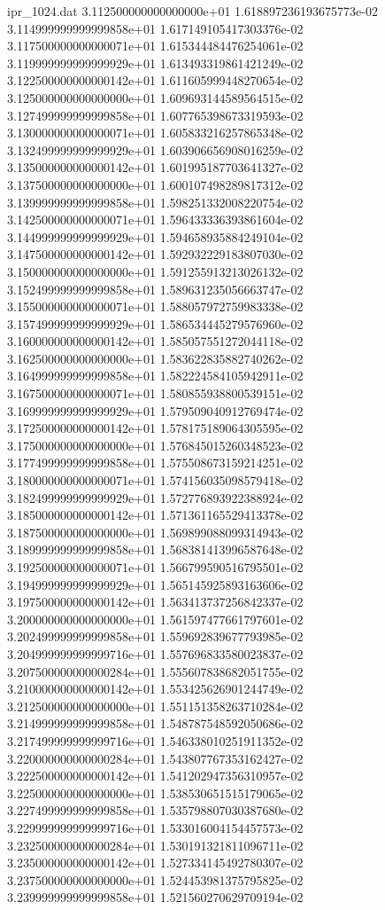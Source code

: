 \begin{filecontents}{ipr_1024.dat}
3.112500000000000000e+01 1.618897236193675773e-02
3.114999999999999858e+01 1.617149105417303376e-02
3.117500000000000071e+01 1.615344484476254061e-02
3.119999999999999929e+01 1.613493319861421249e-02
3.122500000000000142e+01 1.611605999448270654e-02
3.125000000000000000e+01 1.609693144589564515e-02
3.127499999999999858e+01 1.607765398673319593e-02
3.130000000000000071e+01 1.605833216257865348e-02
3.132499999999999929e+01 1.603906656908016259e-02
3.135000000000000142e+01 1.601995187703641327e-02
3.137500000000000000e+01 1.600107498289817312e-02
3.139999999999999858e+01 1.598251332008220754e-02
3.142500000000000071e+01 1.596433336393861604e-02
3.144999999999999929e+01 1.594658935884249104e-02
3.147500000000000142e+01 1.592932229183807030e-02
3.150000000000000000e+01 1.591255913213026132e-02
3.152499999999999858e+01 1.589631235056663747e-02
3.155000000000000071e+01 1.588057972759983338e-02
3.157499999999999929e+01 1.586534445279576960e-02
3.160000000000000142e+01 1.585057551272044118e-02
3.162500000000000000e+01 1.583622835882740262e-02
3.164999999999999858e+01 1.582224584105942911e-02
3.167500000000000071e+01 1.580855938800539151e-02
3.169999999999999929e+01 1.579509040912769474e-02
3.172500000000000142e+01 1.578175189064305595e-02
3.175000000000000000e+01 1.576845015260348523e-02
3.177499999999999858e+01 1.575508673159214251e-02
3.180000000000000071e+01 1.574156035098579418e-02
3.182499999999999929e+01 1.572776893922388924e-02
3.185000000000000142e+01 1.571361165529413378e-02
3.187500000000000000e+01 1.569899088099314943e-02
3.189999999999999858e+01 1.568381413996587648e-02
3.192500000000000071e+01 1.566799590516795501e-02
3.194999999999999929e+01 1.565145925893163606e-02
3.197500000000000142e+01 1.563413737256842337e-02
3.200000000000000000e+01 1.561597477661797601e-02
3.202499999999999858e+01 1.559692839677793985e-02
3.204999999999999716e+01 1.557696833580023837e-02
3.207500000000000284e+01 1.555607838682051755e-02
3.210000000000000142e+01 1.553425626901244749e-02
3.212500000000000000e+01 1.551151358263710284e-02
3.214999999999999858e+01 1.548787548592050686e-02
3.217499999999999716e+01 1.546338010251911352e-02
3.220000000000000284e+01 1.543807767353162427e-02
3.222500000000000142e+01 1.541202947356310957e-02
3.225000000000000000e+01 1.538530651515179065e-02
3.227499999999999858e+01 1.535798807030387680e-02
3.229999999999999716e+01 1.533016004154457573e-02
3.232500000000000284e+01 1.530191321811096711e-02
3.235000000000000142e+01 1.527334145492780307e-02
3.237500000000000000e+01 1.524453981375795825e-02
3.239999999999999858e+01 1.521560270629709194e-02

\end{filecontents}

